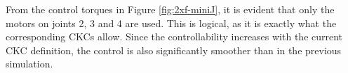 From the control torques in Figure \ref{fig:2xf-miniJ}, it is evident that only the motors on joints 2, 3 and 4 are used. This is logical, as it is exactly what the corresponding CKCs allow. Since the controllability increases with the current CKC definition, the control is also significantly smoother than in the previous simulation.




